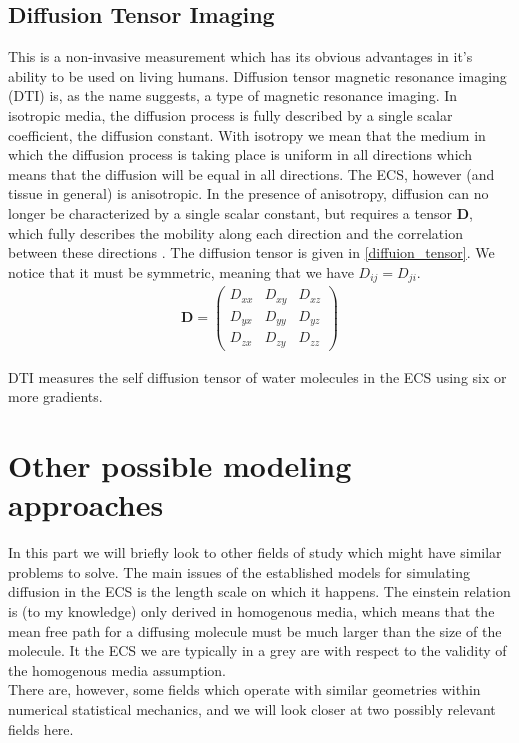 \documentclass[a4paper,english, 12pt, twoside]{article}
\begin{document}
\subsection{Diffusion Tensor Imaging}
This is a non-invasive measurement which has its obvious advantages in it's ability to be used on living humans. 
Diffusion tensor magnetic resonance imaging (DTI) is, as the name suggests, a type of magnetic resonance imaging. 
In isotropic media, the diffusion process is fully described by a single scalar coefficient, the diffusion constant. 
With isotropy we mean that the medium in which the diffusion process is taking place is uniform in all directions which means that the diffusion will be equal in all directions. 
The ECS, however (and tissue in general) is anisotropic. 
In the presence of anisotropy, diffusion can no longer be characterized by a single scalar constant, but requires a tensor $\mathbf{D}$, which fully describes the mobility along each direction and the correlation between these directions \cite{le2001diffusion}. 
The diffusion tensor is given in \ref{diffuion_tensor}. We notice that it must be symmetric, meaning that we have $D_{ij} = D_{ji}$.
\begin{align}\label{diffuion_tensor}
 \mathbf{D} = \left(\begin{array}{ccc}
                     D_{xx} & D_{xy} & D_{xz}\\
                     D_{yx} & D_{yy} & D_{yz}\\
                     D_{zx} & D_{zy} & D_{zz}
                    \end{array}\right)
\end{align}

DTI measures the self diffusion tensor of water molecules in the ECS using six or more gradients. 

\section{Other possible modeling approaches}
In this part we will briefly look to other fields of study which might have similar problems to solve. 
The main issues of the established models for simulating diffusion in the ECS is the length scale on which it happens. 
The einstein relation is (to my knowledge) only derived in homogenous media, which means that the mean free path for a diffusing molecule must be much larger than the size of the molecule. 
It the ECS we are typically in a grey are with respect to the validity of the homogenous media assumption. \\
There are, however, some fields which operate with similar geometries within numerical statistical mechanics, and we will look closer at two possibly relevant fields here.
\end{document}
